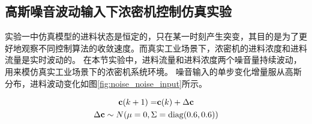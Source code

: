 \subsection{高斯噪音波动输入下浓密机控制仿真实验}
\label{sec:vi_hdp_noise}
实验一中仿真模型的进料状态是恒定的，只在某一时刻产生突变，其目的是为了更好地观察不同控制算法的收敛速度。而真实工业场景下，浓密机的进料浓度和进料流量是实时波动的。
在本节实验中，进料流量和进料浓度两个噪音量持续波动，用来模仿真实工业场景下的浓密机系统环境。
噪音输入的单步变化增量服从高斯分布，进料波动变化如图\ref{fig:noise_noise_input}所示。

\begin{equation}
\begin{split}
 \label{equ:noise_c_disturbance}
 \mathbf c(k+1) =&\mathbf c(k)+\Delta \mathbf c \\
 \Delta \mathbf c \sim N(\mu=0 ,
\Sigma&=\operatorname{diag}(0.6,0.6))
\end{split}
\end{equation}

